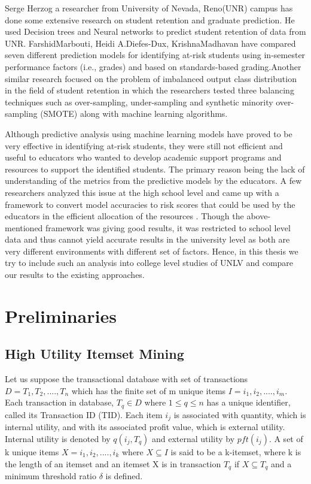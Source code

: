 \documentclass[11pt,openright]{report}
\begin{document}
Serge Herzog a researcher from University of Nevada, Reno(UNR) campus has done some extensive research on student retention and graduate prediction. He used Decision trees and Neural networks to predict student retention of data from UNR\cite{herzog2006estimating}. FarshidMarbouti, Heidi A.Diefes-Dux, KrishnaMadhavan \cite{marbouti2016models} have compared seven different prediction models for identifying at-risk students using in-semester performance factors (i.e., grades) and based on standards-based grading.Another similar research focused on the problem of imbalanced output class distribution in the field of student retention in which the researchers tested three balancing techniques such as over-sampling, under-sampling and synthetic minority over-sampling (SMOTE) along with machine learning algorithms.

Although predictive analysis using machine learning models have proved to be very effective in identifying at-risk students, they were still not efficient and useful to educators who wanted to develop academic support programs and resources to support the identified students. The primary reason being the lack of understanding of the metrics from the predictive models by the educators. A few researchers analyzed this issue at the high school level and came up with a framework to convert model accuracies to risk scores that could be used by the educators in the efficient allocation of the resources \cite{lakkaraju2015machine}. Though the above-mentioned framework was giving good results, it was restricted to school level data and thus cannot yield accurate results in the university level as both are very different environments with different set of factors. Hence, in this thesis we try to include such an analysis into college level studies of UNLV and compare our results to the existing approaches.


\section{Preliminaries}\label{section:preliminaries}
\subsection{High Utility Itemset Mining}
Let us suppose the transactional database with set of transactions $D = {T_1, T_2, ...., T_n}$ which has the finite set of m unique items $I = {i_1, i_2, ...., i_m}$. Each transaction in database, $T_q \in D$ where $1 \leq q \leq n$ has a unique identifier, called its Transaction ID (TID). Each item $i_j$ is associated with quantity, which is internal utility, and with its associated profit value, which is external utility. Internal utility is denoted by $q(i_j, T_q)$ and external utility by $pft(i_j)$. A set of k unique items $X = {i_1, i_2, ...., i_k}$ where $X \subseteq I$ is said to be a k-itemset, where k is the length of an itemset and an itemset X is in transaction $T_q$ if $X \subseteq T_q$ and a minimum threshold ratio $\delta$ is defined.
\end{document}
